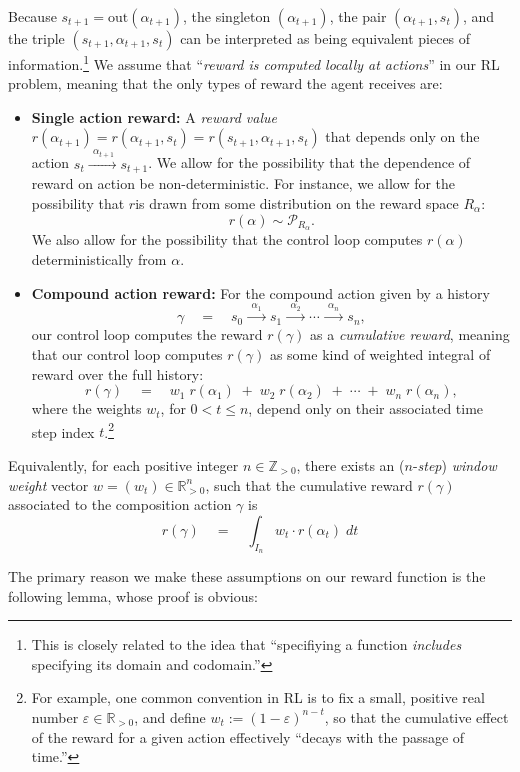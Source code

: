 \documentclass[11pt]{article}
\begin{document}
Because $s_{t+1}=\text{out}(\alpha_{t+1})$, the singleton  $(\alpha_{t+1})$, the pair $(\alpha_{t+1},s_{t})$, and the triple $(s_{t+1},\alpha_{t+1},s_{t})$ can be interpreted as being equivalent pieces of information.\footnote{\;This is closely related to the idea that ``specifiying a function {\em includes} specifying its domain and codomain.''} We assume that ``{\em reward is computed locally at actions}'' in our RL problem, meaning that the only types of reward the agent receives are:
\begin{itemize}
\item {\bf Single action reward:} A {\em reward value} $r(\alpha_{t+1})=r(\alpha_{t+1},s_{t})=r(s_{t+1},\alpha_{t+1},s_{t})$ that depends only on the action $s_{t}\xrightarrow{\ \ \alpha_{t+1}\ }s_{t+1}$. We allow for the possibility that the dependence of reward on action be non-deterministic. For instance, we allow for the possibility that $r$is drawn from some distribution on the reward space $R_{\alpha}$:
$$
r(\alpha)\sim\mathcal{P}_{R_{\alpha}}.
$$
We also allow for the possibility that the control loop computes $r(\alpha)$ deterministically from $\alpha$.
\item {\bf Compound action reward:} For the compound action given by a history
$$
\gamma\quad=\quad
s_{0}\xrightarrow{\ \ \alpha_1\ \ }s_{1}\xrightarrow{\ \ \alpha_2\ \ }\cdots\xrightarrow{\ \ \alpha_n\ \ }s_{n},
$$
our control loop computes the reward $r(\gamma)$ as a {\em cumulative reward}, meaning that our control loop computes $r(\gamma)$ as some kind of weighted integral of reward over the full history:
$$
r(\gamma)
\quad=\quad
w_{1}\;r(\alpha_{1})\;+\;w_{2}\;r(\alpha_{2})\;+\;\cdots\;+\;w_{n}\;r(\alpha_{n}),
$$
where the weights $w_{t}$, for $0< t\le n$, depend only on their associated time step index $t$.\footnote{\;For example, one common convention in RL is to fix a small, positive real number $\varepsilon\in\mathbb{R}_{>0}$, and define $w_{t}:=(1-\varepsilon)^{n-t}$, so that the cumulative effect of the reward for a given action effectively ``decays with the passage of time.''} 
\end{itemize}
Equivalently, for each positive integer $n\in\mathbb{Z}_{>0}$, there exists an ($n$-{\em step}) {\em window weight} vector $w=(w_{t})\in\mathbb{R}^{n}_{>0}$, such that the cumulative reward $r(\gamma)$ associated to the composition action $\gamma$ is
$$
r(\gamma)
\quad=\quad
\int_{I_n}\!\!w_{t}\!\cdot\!r(\alpha_{t})\;dt
$$

The primary reason we make these assumptions on our reward function is the following lemma, whose proof is obvious:
\end{document}
